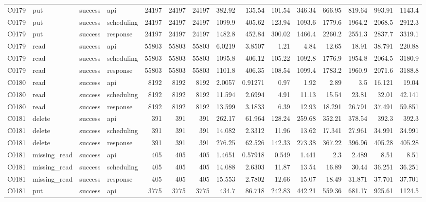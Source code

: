 \begin{landscape}
\begin{longtable}{llllrrrrrrrrrrr}
C0179 & put & success & api & 24197 & 24197 & 24197 & 382.92 & 135.54 & 101.54 & 346.34 & 666.95 & 819.64 & 993.91 & 1143.4\\
C0179 & put & success & scheduling & 24197 & 24197 & 24197 & 1099.9 & 405.62 & 123.94 & 1093.6 & 1779.6 & 1964.2 & 2068.5 & 2912.3\\
C0179 & put & success & response & 24197 & 24197 & 24197 & 1482.8 & 452.84 & 300.02 & 1466.4 & 2260.2 & 2551.3 & 2837.7 & 3319.1\\
C0179 & read & success & api & 55803 & 55803 & 55803 & 6.0219 & 3.8507 & 1.21 & 4.84 & 12.65 & 18.91 & 38.791 & 220.88\\
C0179 & read & success & scheduling & 55803 & 55803 & 55803 & 1095.8 & 406.12 & 105.22 & 1092.8 & 1776.9 & 1954.8 & 2064.5 & 3180.9\\
C0179 & read & success & response & 55803 & 55803 & 55803 & 1101.8 & 406.35 & 108.54 & 1099.4 & 1783.2 & 1960.9 & 2071.6 & 3188.8\\
C0180 & read & success & api & 8192 & 8192 & 8192 & 2.0057 & 0.91271 & 0.97 & 1.92 & 2.89 & 3.5 & 16.121 & 19.04\\
C0180 & read & success & scheduling & 8192 & 8192 & 8192 & 11.594 & 2.6994 & 4.91 & 11.13 & 15.54 & 23.81 & 32.01 & 42.141\\
C0180 & read & success & response & 8192 & 8192 & 8192 & 13.599 & 3.1833 & 6.39 & 12.93 & 18.291 & 26.791 & 37.491 & 59.851\\
C0181 & delete & success & api & 391 & 391 & 391 & 262.17 & 61.964 & 128.24 & 259.68 & 352.21 & 378.54 & 392.3 & 392.3\\
C0181 & delete & success & scheduling & 391 & 391 & 391 & 14.082 & 2.3312 & 11.96 & 13.62 & 17.341 & 27.961 & 34.991 & 34.991\\
C0181 & delete & success & response & 391 & 391 & 391 & 276.25 & 62.526 & 142.33 & 273.38 & 367.22 & 396.96 & 405.28 & 405.28\\
C0181 & missing\_\allowbreak{}read & success & api & 405 & 405 & 405 & 1.4651 & 0.57918 & 0.549 & 1.441 & 2.3 & 2.489 & 8.51 & 8.51\\
C0181 & missing\_\allowbreak{}read & success & scheduling & 405 & 405 & 405 & 14.088 & 2.6303 & 11.87 & 13.54 & 16.89 & 30.44 & 36.251 & 36.251\\
C0181 & missing\_\allowbreak{}read & success & response & 405 & 405 & 405 & 15.553 & 2.7802 & 12.66 & 15.07 & 18.49 & 31.871 & 37.701 & 37.701\\
C0181 & put & success & api & 3775 & 3775 & 3775 & 434.7 & 86.718 & 242.83 & 442.21 & 559.36 & 681.17 & 925.61 & 1124.5\\

\end{longtable}
\end{landscape}
